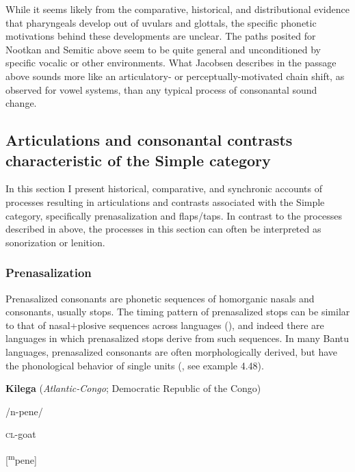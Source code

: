   While it seems likely from the comparative, historical, and distributional evidence that pharyngeals develop out of uvulars and glottals, the specific phonetic motivations behind these developments are unclear. The paths posited for Nootkan and Semitic above seem to be quite general and unconditioned by specific vocalic or other environments. What Jacobsen describes in the passage above sounds more like an articulatory- or perceptually-motivated chain shift, as observed for vowel systems, than any typical process of consonantal sound change.

\subsection{\rmfamily} 
\subsection{Articulations and consonantal contrasts characteristic of the Simple category}\label{sec:4.5.3}

  In this section I present historical, comparative, and synchronic accounts of processes resulting in articulations and contrasts associated with the Simple category, specifically prenasalization and flaps/taps. In contrast to the processes described in  above, the processes in this section can often be interpreted as sonorization or lenition.

\subsubsection{{Prenasalization} }\label{sec:4.5.3.1}

  Prenasalized consonants are phonetic sequences of homorganic nasals and consonants, usually stops. The timing pattern of prenasalized stops can be similar to that of nasal+plosive sequences across languages (\citealt{BrowmanGoldstein1986}), and indeed there are languages in which prenasalized stops derive from such sequences. In many Bantu languages, prenasalized consonants are often morphologically derived, but have the phonological behavior of single units (\citealt{Tak2011}, see example 4.48).

\ea\label{ex:(4.48)}
  \textbf{Kilega} (\textit{Atlantic-Congo}; Democratic Republic of the Congo)

/n-pene/

\textsc{cl}-goat

[\textsuperscript{m}pene]

